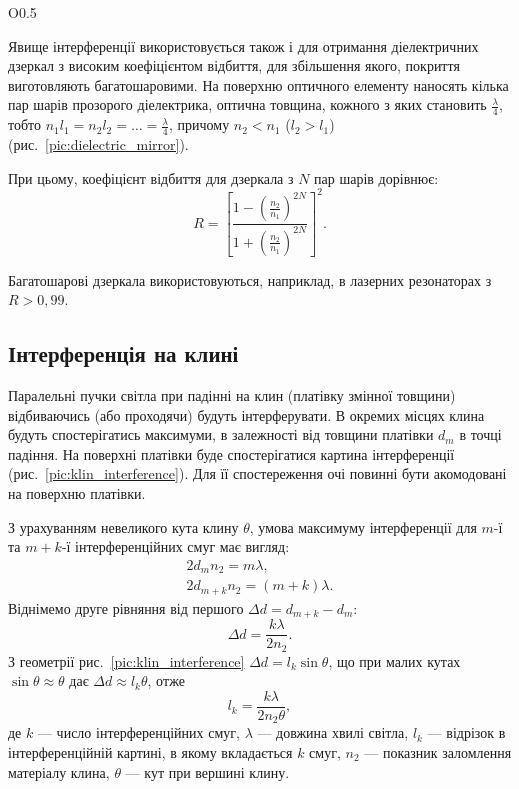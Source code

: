 \begin{wrapfigure}{O}{0.5\linewidth}\centering
	
	\caption{Діелектричне дзеркало.}
	\label{pic:dielectric_mirror}
\end{wrapfigure}
Явище інтерференції використовується також і для отримання діелектричних дзеркал з високим коефіцієнтом відбиття, для збільшення якого, покриття виготовляють багатошаровими. На поверхню оптичного елементу наносять кілька пар шарів прозорого діелектрика, оптична товщина, кожного з яких становить $ \frac\lambda4 $, тобто $ n_1l_1 = n_2 l_2 = \ldots = \frac\lambda4 $, причому $ n_2 < n_1 $ ($ l_2 > l_1$) (рис.~\ref{pic:dielectric_mirror}).

При цьому, коефіцієнт відбиття для дзеркала з $ N $ пар шарів дорівнює:
\begin{equation}\label{key}
    R = \left[ \frac{1 - \left( \frac{n_2}{n_1}\right)^{2N} }{1 + \left( \frac{n_2}{n_1}\right)^{2N}} \right]^2.
\end{equation}

Багатошарові дзеркала використовуються, наприклад,  в лазерних резонаторах з $ R > 0,99 $.


\subsection*{Інтерференція на клині}


Паралельні пучки світла при падінні на клин (платівку змінної товщини) відбиваючись (або проходячи) будуть інтерферувати. В окремих місцях  клина будуть спостерігатись максимуми, в залежності від товщини платівки $d_m$ в точці падіння. На поверхні платівки буде спостерігатися картина інтерференції (рис.~\ref{pic:klin_interference}). Для її спостереження очі повинні бути акомодовані на поверхню платівки.

З урахуванням невеликого кута клину $\theta$, умова максимуму інтерференції
для $m$-ї та $m + k$-ї інтерференційних смуг має вигляд:
\begin{align*}\label{}
	2d_m n_2 = m\lambda, \\
	2d_{m + k}n_2 = (m + k)\lambda.
\end{align*}
Віднімемо друге рівняння від першого $\Delta d = d_{m + k} - d_m $:
\begin{equation*}
	\Delta d = \frac{k\lambda}{2n_2}.
\end{equation*}
З геометрії рис.~\ref{pic:klin_interference} $\Delta d = l_k \sin\theta$, що при малих кутах $\sin\theta \approx \theta$ дає  $\Delta d \approx l_k \theta$, отже
\begin{equation}\label{eq:Klin_interference}
	l_k = \frac{k\lambda}{2n_2\theta},
\end{equation}
де $k$ --- число інтерференційних смуг, $\lambda$ --- довжина хвилі світла, $l_k$ --- відрізок в інтерференційній картині, в якому вкладається $k$ смуг, $n_2$ --- показник заломлення матеріалу клина, $\theta$ --- кут при вершині клину.


